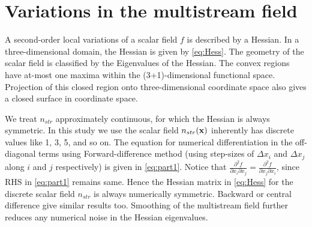 \section{Variations in the multistream field}
\label{appendix:Eigen}

A second-order local variations of a scalar field $f$ is described by a Hessian. In a three-dimensional domain, the Hessian is given by \autoref{eq:Hess}. The geometry of the scalar field is classified by the Eigenvalues of the Hessian. The convex regions have at-most one maxima within the (3+1)-dimensional functional space. Projection of this closed region onto three-dimensional coordinate space also gives a closed surface in coordinate space. 


% 



We treat $n_{str}$ approximately continuous, for which the Hessian is always symmetric. In this study we use the scalar field $n_{str}(\bf{x})$ inherently has discrete values like 1, 3, 5, and so on. The equation for numerical differentiation in the off-diagonal terms using Forward-difference method (using step-sizes of $\Delta x_i$ and $\Delta x_j$ along $i$ and $j$ respectively) is given in \autoref{eq:part1}. Notice that $\frac{\partial^2 f}{\partial x_i \partial x_j} = \frac{\partial^2 f}{\partial x_j \partial x_i}$, since RHS in \autoref{eq:part1} remains same. Hence the Hessian matrix in \autoref{eq:Hess} for the discrete scalar field $n_{str}$ is always numerically symmetric. Backward or central difference give similar results too. Smoothing of the multistream field further reduces any numerical noise in the Hessian eigenvalues.

